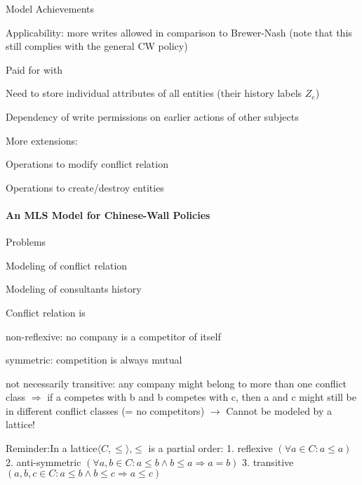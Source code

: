 \documentclass[a4paper]{article}
\begin{document}
\begin{multicols}{3}
    Model Achievements
    \begin{itemize*}
        \item Applicability: more writes allowed in comparison to Brewer-Nash (note that this still complies with the general CW policy)
        \item Paid for with
              \begin{itemize*}
                  \item Need to store individual attributes of all entities (their history labels $Z_e$)
                  \item Dependency of write permissions on earlier actions of other subjects
              \end{itemize*}
        \item More extensions:
              \begin{itemize*}
                  \item Operations to modify conflict relation
                  \item Operations to create/destroy entities
              \end{itemize*}
    \end{itemize*}

    \paragraph{An MLS Model for Chinese-Wall Policies}
    Problems
    \begin{itemize*}
        \item Modeling of conflict relation
        \item Modeling of consultants history
    \end{itemize*}

    Conflict relation is
    \begin{itemize*}
        \item non-reflexive: no company is a competitor of itself
        \item symmetric: competition is always mutual
        \item not necessarily transitive: any company might belong to more than one conflict class $\Rightarrow$ if a competes with b and b competes with c, then a and c might still be in different conflict classes (= no competitors) $\rightarrow$ Cannot be modeled by a lattice!
    \end{itemize*}

    Reminder:In a lattice$⟨C,\leq⟩$,$\leq$ is a partial order:
    1. reflexive $(\forall a\in C:a \leq a)$
    2. anti-symmetric $(\forall a,b \in C:a \leq b \wedge b \leq a\Rightarrow a=b)$
    3. transitive $(a,b,c \in C:a \leq b \wedge b \leq c \Rightarrow a \leq c)$


\end{multicols}
\end{document}

